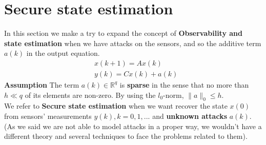 \section{Secure state estimation}
\noindent
In this section we make a try to expand the concept of \textbf{Observability and state estimation} when we have attacks on the sensors, and so the additive term $a(k)$ in the output equation.
\begin{align*}
    &x(k+1)=Ax(k) \\
    &y(k)=Cx(k)+a(k)
\end{align*}
\textbf{Assumption} The term $a(k)\in\mathbb{R}^q$ is  {\color{red}\textbf{sparse}} in the sense that no more than $h\ll q$ of its elements are non-zero. By using the $l_0$-norm, $\lVert a\rVert_0\le h$. \\

We refer to \textbf{Secure state estimation} when we want recover the state $x(0)$ from sensors' measurements $y(k), k=0,1,...$ and \textbf{unknown attacks} $a(k)$. (As we said we are not able to model attacks in a proper way, we wouldn't have a different theory and several techniques to face the problems related to them).

